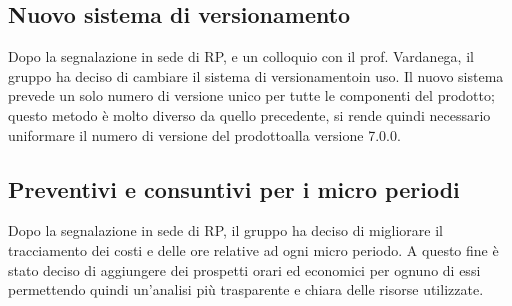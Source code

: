     \subsection{Nuovo sistema di versionamento}
    Dopo la segnalazione in sede di RP, e un colloquio con il prof. Vardanega, il gruppo ha deciso di cambiare il sistema di versionamento\glosp in uso. Il nuovo sistema prevede un solo numero di versione unico per tutte le componenti del prodotto\glo; questo metodo è molto diverso da quello precedente, si rende quindi necessario uniformare il numero di versione del prodotto\glosp alla versione 7.0.0.
    
    \subsection{Preventivi e consuntivi per i micro periodi}
    Dopo la segnalazione in sede di RP, il gruppo ha deciso di migliorare il tracciamento dei costi e delle ore relative ad ogni micro periodo. A questo fine è stato deciso di aggiungere dei prospetti orari ed economici per ognuno di essi permettendo quindi un'analisi più trasparente e chiara delle risorse utilizzate.

